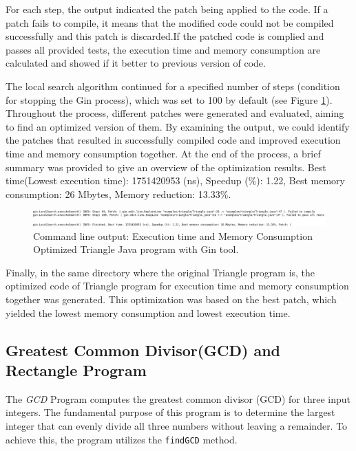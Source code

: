 \vspace{.5em}
For each step, the output indicated the patch being applied to the code. If a patch fails to compile, it means that the modified code could not be compiled successfully and this patch is discarded.If the patched code is complied and passes all provided tests, the execution time and memory consumption are calculated and showed if it better to previous version of code.

\vspace{.5em}
The local search algorithm continued for a specified number of steps (condition for stopping  the Gin process), which was set to 100 by default (see Figure \ref{fig:Ec_MC_2}). Throughout the process, different patches were generated and evaluated, aiming to find an optimized version of them. By examining the output, we could identify the patches that resulted in successfully compiled code and improved execution time and memory consumption together. At the end of the process, a brief summary was provided to give an overview of the optimization results. Best time(Lowest execution time): 1751420953 (ns), Speedup (\%): 1.22, Best memory consumption: 26 Mbytes, Memory reduction: 13.33\%.

\begin{figure}[htbp]
  \centering
  \includegraphics[width=1\textwidth]{img/Triangle_ET_MC_2.png}
  \caption{Command line output: Execution time and Memory Consumption Optimized Triangle Java program with Gin tool.}
  \label{fig:Ec_MC_2}
\end{figure}

\vspace{1em}
Finally, in the same directory where the original Triangle program is, the optimized code of Triangle program for execution time and memory consumption together was generated. This optimization was based on the best patch, which yielded the lowest memory consumption and lowest execution time.

\vspace{-10pt}
\subsection{Greatest Common Divisor(GCD) and Rectangle Program}

The \textit{GCD} Program computes the greatest common divisor (GCD) for three input integers. The fundamental purpose of this program is to determine the largest integer that can evenly divide all three numbers without leaving a remainder. To achieve this, the program utilizes the \texttt{findGCD} method.

